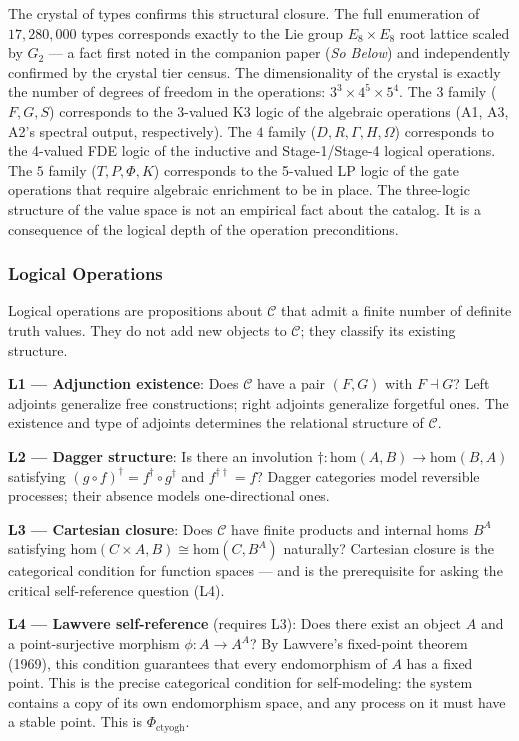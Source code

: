 \documentclass[12pt,a4paper]{article}
\begin{document}
The crystal of types confirms this structural closure. The full enumeration of $17{,}280{,}000$ types corresponds exactly to the Lie group $E_8 \times E_8$ root lattice scaled by $G_2$ --- a fact first noted in the companion paper (\emph{So Below}) and independently confirmed by the crystal tier census. The dimensionality of the crystal is exactly the number of degrees of freedom in the operations: $3^3 \times 4^5 \times 5^4$. The $3$ family ($F,G,S$) corresponds to the 3-valued K3 logic of the algebraic operations (A1, A3, A2's spectral output, respectively). The $4$ family ($D,R,\Gamma,H,\Omega$) corresponds to the 4-valued FDE logic of the inductive and Stage-1/Stage-4 logical operations. The $5$ family ($T,P,\Phi,K$) corresponds to the 5-valued LP logic of the gate operations that require algebraic enrichment to be in place. The three-logic structure of the value space is not an empirical fact about the catalog. It is a consequence of the logical depth of the operation preconditions.

\subsubsection{Logical Operations}
Logical operations are propositions about $\mathcal{C}$ that admit a finite number of definite truth values. They do not add new objects to $\mathcal{C}$; they classify its existing structure.

\textbf{L1 --- Adjunction existence}: Does $\mathcal{C}$ have a pair $(F, G)$ with $F \dashv G$? Left adjoints generalize free constructions; right adjoints generalize forgetful ones. The existence and type of adjoints determines the relational structure of $\mathcal{C}$.

\textbf{L2 --- Dagger structure}: Is there an involution $\dagger: \text{hom}(A,B) \to \text{hom}(B,A)$ satisfying $(g \circ f)^\dagger = f^\dagger \circ g^\dagger$ and $f^{\dagger\dagger} = f$? Dagger categories model reversible processes; their absence models one-directional ones.

\textbf{L3 --- Cartesian closure}: Does $\mathcal{C}$ have finite products and internal homs $B^A$ satisfying $\text{hom}(C \times A, B) \cong \text{hom}(C, B^A)$ naturally? Cartesian closure is the categorical condition for function spaces --- and is the prerequisite for asking the critical self-reference question (L4).

\textbf{L4 --- Lawvere self-reference} (requires L3): Does there exist an object $A$ and a point-surjective morphism $\phi: A \to A^A$? By Lawvere's fixed-point theorem (1969), this condition guarantees that every endomorphism of $A$ has a fixed point. This is the precise categorical condition for self-modeling: the system contains a copy of its own endomorphism space, and any process on it must have a stable point. This is $\Phi_{\text{ctyogh}}$.
\end{document}
